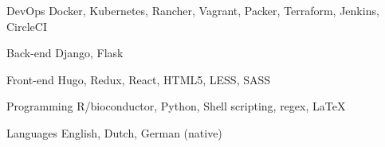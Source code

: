 

\begin{cvskills}

  \cvskill
    {DevOps} %
    {Docker, Kubernetes, Rancher, Vagrant, Packer, Terraform, Jenkins, CircleCI} %

  \cvskill
    {Back-end} %
    {Django, Flask} %

  \cvskill
    {Front-end} %
    {Hugo, Redux, React, HTML5, LESS, SASS} %

  \cvskill
    {Programming} %
    {R/bioconductor, Python, Shell scripting, regex, LaTeX} %

  \cvskill
    {Languages} %
    {English, Dutch, German (native)} %

\end{cvskills}
